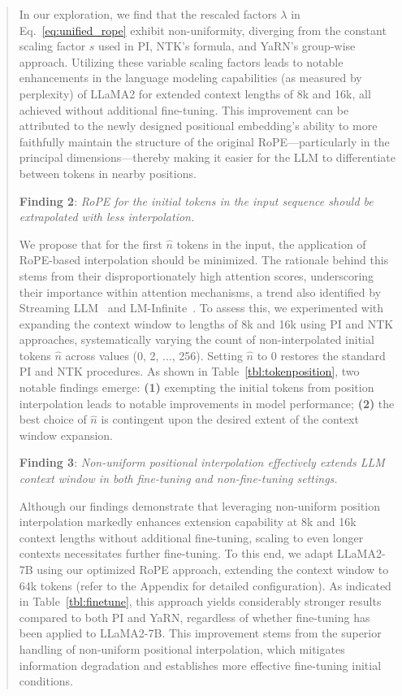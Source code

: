 \begin{abstract}
In our exploration, we find that the rescaled factors $\lambda$ in Eq.~\ref{eq:unified_rope} exhibit non-uniformity, diverging from the constant scaling factor $s$ used in PI, NTK's formula, and YaRN's group-wise approach. Utilizing these variable scaling factors leads to notable enhancements in the language modeling capabilities (as measured by perplexity) of LLaMA2 for extended context lengths of 8k and 16k, all achieved without additional fine-tuning. This improvement can be attributed to the newly designed positional embedding's ability to more faithfully maintain the structure of the original RoPE—particularly in the principal dimensions—thereby making it easier for the LLM to differentiate between tokens in nearby positions.

\textbf{Finding 2}: \textit{RoPE for the initial tokens in the input sequence should be extrapolated with less interpolation.} 

We propose that for the first $\hat{n}$ tokens in the input, the application of RoPE-based interpolation should be minimized. The rationale behind this stems from their disproportionately high attention scores, underscoring their importance within attention mechanisms, a trend also identified by Streaming LLM~\cite{streamingllm} and LM-Infinite~\cite{han2023lminfinite}. To assess this, we experimented with expanding the context window to lengths of 8k and 16k using PI and NTK approaches, systematically varying the count of non-interpolated initial tokens $\hat{n}$ across values (0, 2, ..., 256). Setting $\hat{n}$ to 0 restores the standard PI and NTK procedures. As shown in Table~\ref{tbl:tokenposition}, two notable findings emerge: \textbf{(1)} exempting the initial tokens from position interpolation leads to notable improvements in model performance; \textbf{(2)} the best choice of $\hat{n}$ is contingent upon the desired extent of the context window expansion.

\textbf{Finding 3}: \textit{Non-uniform positional interpolation effectively extends LLM context window in both fine-tuning and non-fine-tuning settings.} 

Although our findings demonstrate that leveraging non-uniform position interpolation markedly enhances extension capability at 8k and 16k context lengths without additional fine-tuning, scaling to even longer contexts necessitates further fine-tuning. To this end, we adapt LLaMA2-7B using our optimized RoPE approach, extending the context window to 64k tokens (refer to the Appendix for detailed configuration). As indicated in Table~\ref{tbl:finetune}, this approach yields considerably stronger results compared to both PI and YaRN, regardless of whether fine-tuning has been applied to LLaMA2-7B. This improvement stems from the superior handling of non-uniform positional interpolation, which mitigates information degradation and establishes more effective fine-tuning initial conditions.


\end{abstract}
